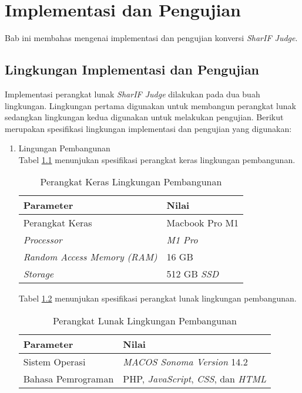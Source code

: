\chapter{Implementasi dan Pengujian}
\label{chap:implementasidanpengujian}
Bab ini membahas mengenai implementasi dan pengujian konversi \textit{SharIF Judge}.
\section{Lingkungan Implementasi dan Pengujian}
Implementasi perangkat lunak \textit{SharIF Judge} dilakukan pada dua buah lingkungan. Lingkungan pertama digunakan untuk membangun perangkat lunak sedangkan lingkungan kedua digunakan untuk melakukan pengujian. Berikut merupakan spesifikasi lingkungan implementasi dan pengujian yang digunakan:

\begin{enumerate}
	\item Lingungan Pembangunan\\
	Tabel \ref{tab:devhard} menunjukan spesifikasi perangkat keras lingkungan pembangunan.
	\begin{table}[H]
 	\caption{Perangkat Keras Lingkungan Pembangunan}
	\label{tab:devhard}
    \centering
    	\begin{tabular}{|l|l|}
    	\hline
        	\textbf{Parameter} & \textbf{Nilai} \\ \hline
        	Perangkat Keras & Macbook Pro M1 \\ \hline
        	\textit{Processor} & \textit{M1 Pro} \\ \hline
        	\textit{Random Access Memory (RAM)} & 16 GB \\ \hline
        	\textit{Storage} & 512 GB \textit{SSD} \\ \hline
    	\end{tabular}
	\end{table}
	Tabel \ref{tab:devsoft} menunjukan spesifikasi perangkat lunak lingkungan pembangunan.
 	\begin{table}[H]
 	\caption{Perangkat Lunak Lingkungan Pembangunan}
	\label{tab:devsoft}
    \centering
    	\begin{tabular}{|l|l|}
    	\hline
        	\textbf{Parameter} & \textbf{Nilai} \\ \hline
        	Sistem Operasi & \textit{MACOS Sonoma Version} 14.2 \\ \hline
        	Bahasa Pemrograman & PHP, \textit{JavaScript}, \textit{CSS}, dan \textit{HTML} \\ \hline

\end{tabular}
\end{table}
\end{enumerate}
